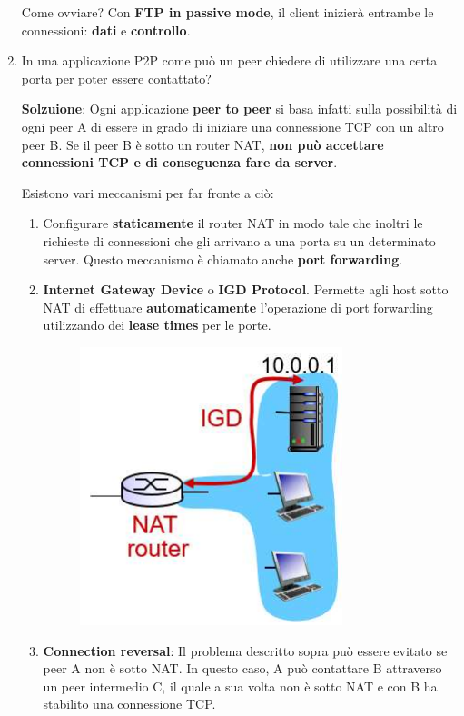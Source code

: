 \documentclass[11pt,a4paper,oneside]{book}
\theoremstyle{definition}
\begin{document}
\begin{enumerate}
	      Come ovviare? Con \textbf{FTP in passive mode}, il client inizierà entrambe le connessioni: \textbf{dati} e \textbf{controllo}.


	      \pagebreak

	\item In una applicazione P2P come può un peer chiedere di
	      utilizzare una certa porta per poter essere contattato?

	      \textbf{Solzuione}: Ogni applicazione \textbf{peer to peer} si basa infatti sulla possibilità di ogni peer A di essere in grado di iniziare una connessione TCP con un altro peer B. Se il peer B è sotto un router NAT, \textbf{non può accettare connessioni TCP e di conseguenza fare da server}.

	      Esistono vari meccanismi per far fronte a ciò:

	      \begin{enumerate}
		      \item Configurare \textbf{staticamente} il router NAT in modo tale che inoltri le richieste di connessioni che gli arrivano a una porta su un determinato server. Questo meccanismo è chiamato anche \textbf{port forwarding}.

		      \item  \textbf{Internet Gateway Device} o \textbf{IGD Protocol}. Permette agli host sotto NAT di effettuare \textbf{automaticamente} l'operazione di port forwarding utilizzando dei \textbf{lease times} per le porte.

		            \begin{figure}[!h]
			            \includegraphics[scale=0.35]{Immagini/Natp2.png}
			            \centering
		            \end{figure}

		      \item \textbf{Connection reversal}:  Il problema descritto sopra può essere evitato se peer A non è sotto NAT. In questo caso, A può contattare B attraverso un peer intermedio C, il quale a sua volta non è sotto NAT e con B ha stabilito una connessione TCP.


\end{enumerate}
\end{enumerate}
\end{document}
